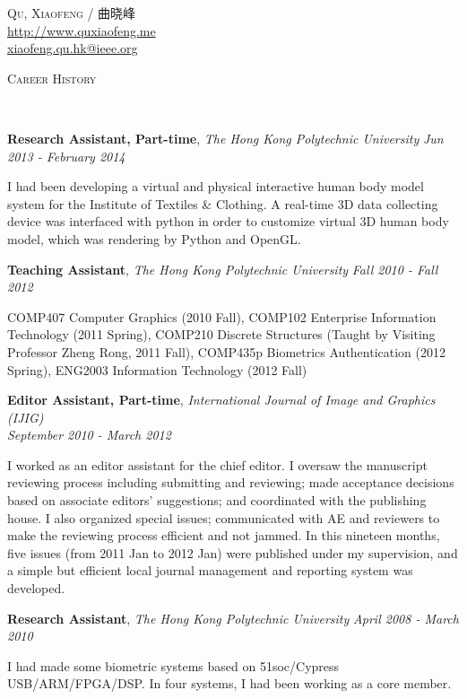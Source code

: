 \documentclass{article}
\newenvironment{changemargin}[2]{%
  \begin{list}{}{%
    \setlength{\topsep}{0pt}%
    \setlength{\leftmargin}{#1}%
    \setlength{\rightmargin}{#2}%
    \setlength{\listparindent}{\parindent}%
    \setlength{\itemindent}{\parindent}%
    \setlength{\parsep}{\parskip}%
  }%
  \item[]}{\end{list}
}
\newcommand{\lineover}{
	\begin{changemargin}{-0.05in}{-0.05in}
		\vspace*{-8pt}
		\hrulefill \\
		\vspace*{-2pt}
	\end{changemargin}
}
\newcommand{\header}[1]{
	\begin{changemargin}{-0.5in}{-0.5in}
		\scshape{#1}\\
  	\lineover
	\end{changemargin}
}
\newcommand{\contact}[3]{
	\begin{changemargin}{-0.5in}{-0.5in}
		\begin{center}
			{\Large \scshape {#1}}\\ \smallskip
      {\url{#2}}\\ \smallskip 
      {\href{mailto:#3}{#3}}\\ \smallskip
		\end{center}
	\end{changemargin}
}
\newcommand{\jobtitle}[3]{
	\textbf{#1}, \emph{#2} \hfill \emph{#3}\\
}
\newcommand{\jobdescription}[1]{
	\begin{changemargin}{0.15in}{0.15in}
    \smallskip
		{#1}
    \medskip
	\end{changemargin}
}
\newenvironment{body} {
	\vspace*{-16pt}
	\begin{changemargin}{-0.25in}{-0.5in}
  }	
	{\end{changemargin}
}
\begin{document}
\contact{Qu, Xiaofeng / 曲晓峰}{http://www.quxiaofeng.me}{xiaofeng.qu.hk@ieee.org}


\header{Career History}

\begin{body}
  \vspace{14pt}

    \jobtitle{Research Assistant, Part-time}{The Hong Kong Polytechnic University}{Jun 2013 - February 2014}
    \jobdescription{
        I had been developing a virtual and physical interactive human body model system for the Institute of Textiles \& Clothing. A real-time 3D data collecting device was interfaced with python in order to customize virtual 3D human body model, which was rendering by Python and OpenGL.
    }

    \jobtitle{Teaching Assistant}{The Hong Kong Polytechnic University}{Fall 2010 - Fall 2012}
    \jobdescription {
        COMP407 Computer Graphics (2010 Fall),
        COMP102 Enterprise Information Technology (2011 Spring), 
        COMP210 Discrete Structures (Taught by Visiting Professor Zheng Rong, 2011 Fall),  COMP435p Biometrics Authentication (2012 Spring), 
        ENG2003 Information Technology (2012 Fall)
    }

    \jobtitle{Editor Assistant, Part-time}{International Journal of Image and Graphics (IJIG)\\}{September 2010 - March 2012}
    \jobdescription{
        I worked as an editor assistant for the chief editor. I oversaw the manuscript reviewing process including submitting and reviewing; made acceptance decisions based on associate editors' suggestions; and coordinated with the publishing house. I also organized special issues; communicated with AE and reviewers to make the reviewing process efficient and not jammed. In this nineteen months, five issues (from 2011 Jan to 2012 Jan) were published under my supervision, and a simple but efficient local journal management and reporting system was developed.
    }

	\jobtitle{Research Assistant}{The Hong Kong Polytechnic University}{April 2008 - March 2010}
    \jobdescription{
        I had made some biometric systems based on 51soc/Cypress USB/ARM/FPGA/DSP. In four systems, I had been working as a core member.
    }

\end{body}
\end{document}
